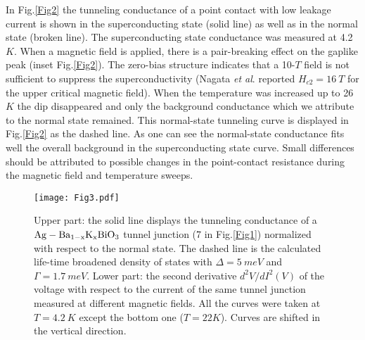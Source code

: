 \documentclass[twocolumn,amsmath,floats,showpacs,nofootinbib]{revtex4}
\begin{document}
In Fig.\ref{Fig2} the tunneling conductance of a point contact with low leakage current is shown in the superconducting state (solid line) as well as in the normal state (broken line). The superconducting state conductance was measured at 4.2~$K$. When a magnetic field is applied, there is a pair-breaking effect on the gaplike peak (inset Fig.\ref{Fig2}). The zero-bias structure indicates that a 10-$T$ field is not sufficient to suppress the superconductivity (Nagata \emph{et al}. \cite{15} reported $H_{c2}= 16\ T$ for the upper critical magnetic field). When the temperature was increased up to 26~$K$ the dip disappeared and only the background conductance which we attribute to the normal state remained. This normal-state tunneling curve is displayed in Fig.\ref{Fig2} as the dashed line. As one can see the normal-state conductance fits well the overall background in the superconducting state curve. Small differences should be attributed to possible changes in the point-contact resistance during the magnetic field and temperature sweeps.

\begin{figure}[]
\texttt{[image: Fig3.pdf]}
\caption[]{Upper part: the solid line displays the tunneling conductance of a $\rm Ag-Ba_{1-x}K_xBiO_3$ tunnel junction (7 in Fig.\ref{Fig1}) normalized with respect to the normal state. The dashed line is the calculated life-time broadened density of states with $\Delta= 5\ meV$ and $\Gamma= 1.7\ meV$. Lower part: the second derivative $d^2V/dI^2(V)$ of the voltage with respect to the current of the same tunnel junction measured at different magnetic fields. All the curves were taken at $T=4.2\ K$ except the bottom one ($T=22 K$). Curves are shifted in the vertical direction.}
\label{Fig3}
\end{figure}
\end{document}
